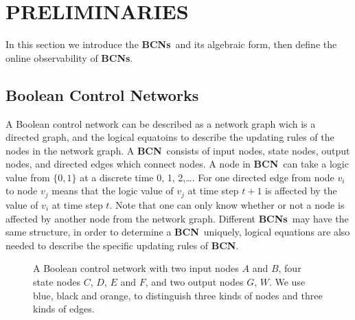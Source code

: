 \documentclass[letterpaper, 10 pt, conference]{ieeeconf}  %
\def \BCN {{\bf BCN}}
\def \BCNs {{\bf BCNs}}
\begin{document}
\section{PRELIMINARIES}
In this section we introduce the \BCNs\ and its algebraic form, then define the online observability of {\bf BCNs}.
\subsection{Boolean Control Networks}

A Boolean control network can be described as a network graph wich is a directed graph, and the logical equatoins to describe the updating rules of the nodes in the network graph. A \BCN\ consists of input nodes, state nodes, output nodes, and directed edges which connect nodes. A node in \BCN\ can take a logic value from $\{0,1\}$ at a discrete time 0, 1, 2,\ldots. For one directed edge from node $v_i$ to node $v_j$ means that the logic value of $v_j$ at time step $t+1$ is affected by the value of $v_i$ at time step $t$. Note that one can only know whether or not a node is affected by another node from the network graph. Different \BCNs\ may have the same structure, in order to determine a \BCN\ uniquely, logical equations are also needed to describe the specific updating rules of {\bf BCN}.

 
 \begin{figure}[thpb]
      \centering
      
      \caption{A Boolean control network with two input nodes $A$ and $B$, four state nodes $C$, $D$, $E$ and $F$, and two output nodes $G$, $W$. We use blue, black and orange, to distinguish three kinds of nodes and three kinds of edges.}
      \label{fig:1}
  \end{figure}
\end{document}

